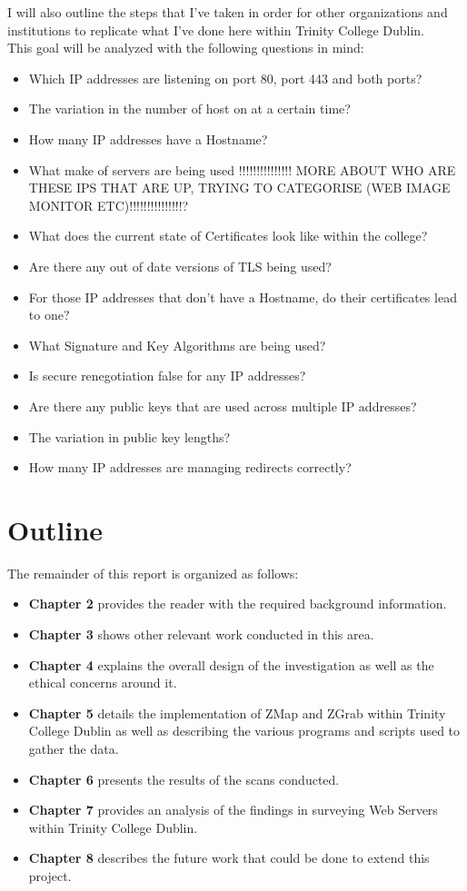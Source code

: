 \documentclass[a4wide,leqno,12pt]{report}
\begin{document}
I will also outline the steps that I've taken in order for other organizations and institutions to replicate what I've done here within Trinity College Dublin.\\


This goal will be analyzed with the following questions in mind:
\begin{itemize}
  \item Which IP addresses are listening on port 80, port 443 and both ports?
  \item The variation in the number of host on at a certain time?
  \item How many IP addresses have a Hostname?
  \item What make of servers are being used !!!!!!!!!!!!!!! MORE ABOUT WHO ARE THESE IPS THAT ARE UP, TRYING TO CATEGORISE (WEB IMAGE MONITOR ETC)!!!!!!!!!!!!!!!?
  \item What does the current state of Certificates look like within the college?
  \item Are there any out of date versions of TLS being used?
  \item For those IP addresses that don't have a Hostname, do their certificates lead to one?
  \item What Signature and Key Algorithms are being used?
  \item Is secure renegotiation false for any IP addresses?
  \item Are there any public keys that are used across multiple IP addresses?
  \item The variation in public key lengths?
  \item How many IP addresses are managing redirects correctly?
 
\end{itemize}
\section{Outline}
The remainder of this report is organized as follows:\\
\begin{itemize}
\item\textbf{Chapter 2} provides the reader with the required background information.
\item\textbf{Chapter 3} shows other relevant work conducted in this area.
\item\textbf{Chapter 4} explains the overall design of the investigation as well as the ethical concerns around it.
\item\textbf{Chapter 5} details the implementation of ZMap and ZGrab within Trinity College Dublin as well as describing the various programs and scripts used to gather the data.
\item\textbf{Chapter 6} presents the results of the scans conducted.
\item\textbf{Chapter 7} provides an analysis of the findings in surveying Web Servers within Trinity College Dublin.
\item\textbf{Chapter 8} describes the future work that could be done to extend this project.
\end{itemize}
\end{document}
